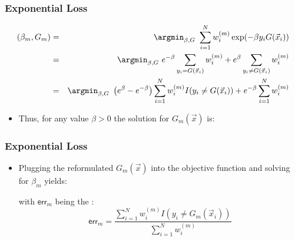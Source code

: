\begin{frame}
  \frametitle{Exponential Loss \cont}

  \vspace{-.5cm}
  \begin{eqnarray*}
    (\beta_m, G_m) 
      &=& \argmin_{\beta, G} ~\sum_{i=1}^N w_i^{(m)} \exp (-\beta y_i G(\vec{x}_i)) \\ %
      &=& \argmin_{\beta, G} ~ e^{-\beta} \sum_{y_i = G(\vec{x}_i)} w_i^{(m)} + e^{\beta} \sum_{y_i \neq G(\vec{x}_i)} w_i^{(m)} \\ %
      &=& \argmin_{\beta, G} ~ \left( e^{\beta} - e^{-\beta} \right) \sum_{i=1}^N w_i^{(m)} I(y_i \neq G(\vec{x}_i)) + e^{-\beta} \sum_{i=1}^N w_i^{(m)}
  \end{eqnarray*}
  \pause

  \begin{itemize}
    \item Thus, for any value $\beta > 0$ the solution for $G_m(\vec x)$ is: \\[.25cm]
      \begin{center}
      \end{center}
  \end{itemize}
\end{frame}


\begin{frame}
  \frametitle{Exponential Loss \cont}

  \begin{itemize}
    \item Plugging the reformulated $G_m(\vec x)$ into the objective function and solving for $\beta_m$ yields: \\[.15cm]
      \begin{center}
      \end{center}
      \vspace{.25cm}
      
      with $\mathsf{err}_m$ being the : \\[.15cm]
      
      \begin{displaymath}
        \mathsf{err}_m = \frac{\sum_{i=1}^N w_i^{(m)} I(y_i \neq G_m(\vec{x}_i))}{\sum_{i=1}^N w_i^{(m)}}
      \end{displaymath}
  \end{itemize}
\end{frame}



